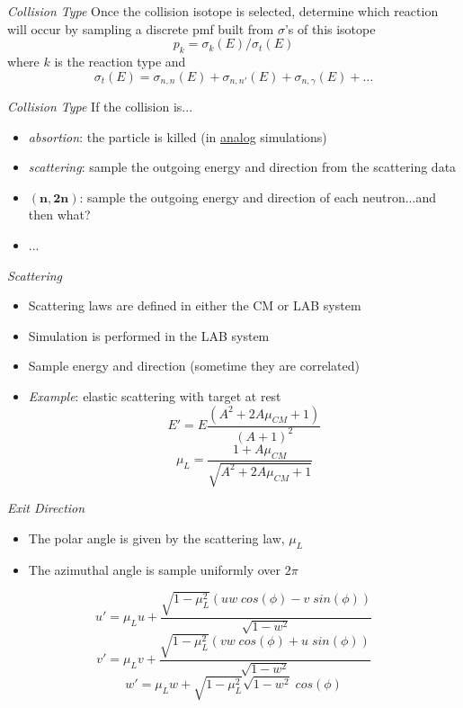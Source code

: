 \emph{Collision Type}
  Once the collision isotope is selected, determine which reaction will 
  occur by sampling a discrete pmf built from $\sigma$'s of this isotope
  \begin{equation*}
       p_{k} = \sigma_{k}(E) / \sigma_{t}(E)     
  \end{equation*}
  where $k$ is the reaction type and 
  \begin{equation*}
     \sigma_{t}(E) = \sigma_{n,n}(E) + \sigma_{n,n'}(E) + \sigma_{n,\gamma}(E) + \dots
  \end{equation*}


\emph{Collision Type}
If the collision is...
    \begin{itemize}
      \item \emph{absortion}: the particle is killed (in \underline{analog} simulations)
      \item \emph{scattering}: sample the outgoing energy and direction from the scattering data
      \item $\mathbf{(n,2n)}$: sample the outgoing energy and direction of each neutron...and then what?
      \item ...
   \end{itemize}


\emph{Scattering}
 \begin{itemize}
  \item Scattering laws are defined in either the CM or LAB system
  
  \item Simulation is performed in the LAB system
  
  \item Sample energy and direction (sometime they are correlated)
  
  \item \emph{ Example}: elastic scattering with target at rest
  \begin{equation*}
  E' = E \frac{(A^2+2A \mu_{CM}+1)}{(A+1)^2}
  \end{equation*}
  \begin{equation*}
  \mu_{L} = \frac{1+A \mu_{CM}}{\sqrt{A^2+2A \mu_{CM}+1}}
  \end{equation*}
 \end{itemize}


\emph{Exit Direction}
 \begin{itemize}
  \item The polar angle is given by the scattering law, $\mu_{L}$
  \item The azimuthal angle is sample uniformly over $2 \pi$
 \end{itemize}
  \begin{equation*}
    u' = \mu_{L}u+\frac{\sqrt{1-\mu_{L}^{2}}(uw \; cos(\phi)-v \; sin(\phi))}{\sqrt{1-w^2}}
  \end{equation*}
  \begin{equation*}
    v' = \mu_{L}v+\frac{\sqrt{1-\mu_{L}^{2}}(vw \; cos(\phi)+u \; sin(\phi))}{\sqrt{1-w^2}}
  \end{equation*}
  \begin{equation*}
    w' = \mu_{L}w+\sqrt{1-\mu_{L}^{2}}\sqrt{1-w^2} \; cos(\phi)
  \end{equation*}


